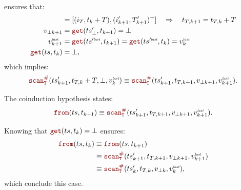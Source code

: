 \begin{skippableproof}
\begin{itemize}
\begin{itemize}
                         ensures that:
                        \begin{align*}
                            [(i_{k+1}, T_{k+1})^+] & = [(i_T, t_k + T), (i'_{k+1}, T'_{k+1})^+]
                            \quad \Rightarrow \quad t_{T, k+1} = t_{T, k} + T                                                                   \\
                            v_{\bot k+1}           & = \getAt{\ts'_\bot}{t_{k+1}} = \bot                                                        \\
                            v^\explast_{k+1}       & = \getAt{\ts^{\prime\explast}}{t_{k+1}} = \getAt{\ts^{\prime\explast}}{t_k} = v^\explast_k \\
                            \getAt{\ts}{t_k}       & = \bot,
                        \end{align*}
                        which implies:
                        \begin{equation*}
                            \scanAux{\ts'_{k+1}}{T}{t_{T, k} + T}{\bot}{v^\explast_k} \equiv
                            \scanAux{\ts'_{k+1}}{T}{t_{T, k+1}}{v_{\bot k+1}}{v^\explast_{k+1}}.
                        \end{equation*}

                        The coinduction hypothesis states:
                        \begin{equation*}
                            \from{\ts}{t_{k+1}} \equiv \scanAux{\ts'_{k+1}}{T}{t_{T, k+1}}{v_{\bot k+1}}{v^\explast_{k+1}}.
                        \end{equation*}

                        Knowing that $\getAt{\ts}{t_k} = \bot$ ensures:
                        \begin{align*}
                            \from{\ts}{t_k} & \equiv \from{\ts}{t_{k+1}}                                                 \\
                                            & \equiv \scanAux{\ts'_{k+1}}{T}{t_{T, k+1}}{v_{\bot k+1}}{v^\explast_{k+1}} \\
                                            & \equiv \scanAux{\ts'_k}{T}{t_{T, k}}{v_{\bot k}}{v^\explast_k},
                        \end{align*}
                        which conclude this case.


\end{itemize}
\end{itemize}
\end{skippableproof}
